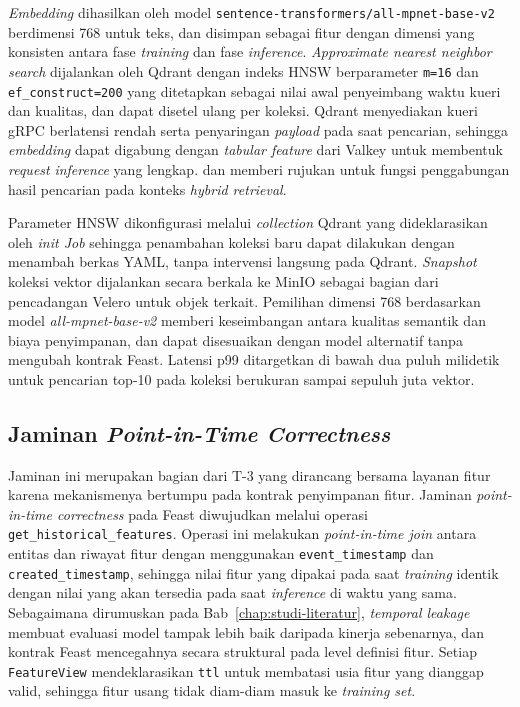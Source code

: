 \textit{Embedding} dihasilkan oleh model \texttt{sentence-transformers/}\allowbreak\texttt{all-mpnet-base-v2} \autocite{reimers2019sentence} berdimensi 768 untuk teks, dan disimpan sebagai fitur dengan dimensi yang konsisten antara fase \textit{training} dan fase \textit{inference}. \textit{Approximate nearest neighbor search} dijalankan oleh Qdrant \autocite{qdrant2025} dengan indeks HNSW \autocite{malkov2020efficient} berparameter \texttt{m=16} dan \texttt{ef\_construct=200} yang ditetapkan sebagai nilai awal penyeimbang waktu kueri dan kualitas, dan dapat disetel ulang per koleksi. Qdrant menyediakan kueri gRPC berlatensi rendah serta penyaringan \textit{payload} pada saat pencarian, sehingga \textit{embedding} dapat digabung dengan \textit{tabular feature} dari Valkey untuk membentuk \textit{request} \textit{inference} yang lengkap. \textcite{bruch2023hybrid} dan \textcite{campese2024coherence} memberi rujukan untuk fungsi penggabungan hasil pencarian pada konteks \textit{hybrid retrieval}.

Parameter HNSW dikonfigurasi melalui \textit{collection} Qdrant yang dideklarasikan oleh \textit{init Job} sehingga penambahan koleksi baru dapat dilakukan dengan menambah berkas YAML, tanpa intervensi langsung pada Qdrant. \textit{Snapshot} koleksi vektor dijalankan secara berkala ke MinIO sebagai bagian dari pencadangan Velero untuk objek terkait. Pemilihan dimensi 768 berdasarkan model \textit{all-mpnet-base-v2} memberi keseimbangan antara kualitas semantik dan biaya penyimpanan, dan dapat disesuaikan dengan model alternatif tanpa mengubah kontrak Feast. Latensi p99 ditargetkan di bawah dua puluh milidetik untuk pencarian top-10 pada koleksi berukuran sampai sepuluh juta vektor.

\subsection{Jaminan \textit{Point-in-Time Correctness}}
\label{subsec:jaminan-pit}

Jaminan ini merupakan bagian dari T-3 yang dirancang bersama layanan fitur karena mekanismenya bertumpu pada kontrak penyimpanan fitur. Jaminan \textit{point-in-time correctness} pada Feast diwujudkan melalui operasi \texttt{get\_historical\_features}. Operasi ini melakukan \textit{point-in-time join} antara entitas dan riwayat fitur dengan menggunakan \texttt{event\_timestamp} dan \texttt{created\_timestamp}, sehingga nilai fitur yang dipakai pada saat \textit{training} identik dengan nilai yang akan tersedia pada saat \textit{inference} di waktu yang sama. Sebagaimana dirumuskan pada Bab~\ref{chap:studi-literatur}, \textit{temporal leakage} membuat evaluasi model tampak lebih baik daripada kinerja sebenarnya, dan kontrak Feast mencegahnya secara struktural pada level definisi fitur. Setiap \texttt{FeatureView} mendeklarasikan \texttt{ttl} untuk membatasi usia fitur yang dianggap valid, sehingga fitur usang tidak diam-diam masuk ke \textit{training set}.

